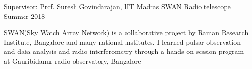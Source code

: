 \begin{cventries}
  \cventry
    {Supervisor: Prof. Suresh Govindarajan, IIT Madras} %
    {SWAN Radio telescope} %
    {} %
    {Summer 2018} %
    {
      \begin{cvitems} %
        \item {SWAN(Sky Watch Array Network) is a collaborative project by Raman Research Institute, Bangalore
and many national institutes. I learned pulsar observation and data analysis and radio interferometry
through a hands on session program at Gauribidanur radio observatory, Bangalore}
      \end{cvitems}
    }

\end{cventries}

